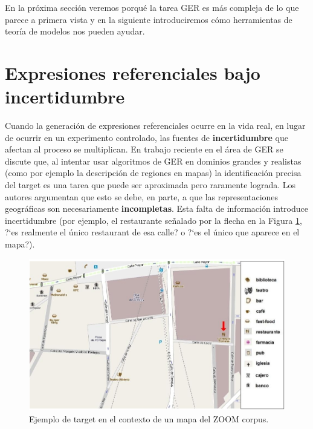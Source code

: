 En la pr\'oxima secci\'on veremos porqu\'e la tarea GER es m\'as compleja de lo que parece a primera vista y en la siguiente introduciremos c\'omo herramientas de teor\'ia de modelos nos pueden ayudar.

\section{Expresiones referenciales bajo incertidumbre}
\label{sec:gre-incertidumbre}


Cuando la generaci\'on de expresiones referenciales ocurre en la vida real, en lugar de ocurrir en un experimento controlado, las fuentes de \textbf{incertidumbre} que afectan al proceso se multiplican. En trabajo 
reciente en el \'area de GER \cite{turner2008,turner2009} se discute que, al intentar usar algoritmos de GER en dominios grandes 
y realistas (como por ejemplo la descripci\'on de regiones en mapas) la identificaci\'on precisa del target es una tarea que puede ser 
aproximada pero raramente lograda. Los autores argumentan que esto se debe, en parte, a que las representaciones geogr\'aficas 
son necesariamente \textbf{incompletas}. Esta falta de informaci\'on introduce incertidumbre (por ejemplo, el restaurante se\~nalado por la flecha en la Figura \ref{target_mapa}, ?`es realmente el \'unico restaurant de esa calle? o ?`es el \'unico que aparece en el mapa?).

\begin{figure}[h]
\centering
\includegraphics[width=\textwidth]{images/corpus/mapa15.png}
\caption{Ejemplo de target en el contexto de un mapa del ZOOM corpus.}
\label{target_mapa}
\end{figure}

